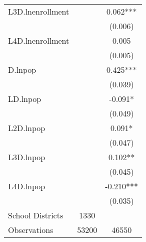 \begin{tabular}{lcc}
L3D.lnenrollment    &  & 0.062*** \\
                    &  & (0.006) \\
L4D.lnenrollment    &  & 0.005 \\
                    &  & (0.005) \\
D.lnpop             &  & 0.425*** \\
                    &  & (0.039) \\
LD.lnpop            &  & -0.091* \\
                    &  & (0.049) \\
L2D.lnpop           &  & 0.091* \\
                    &  & (0.047) \\
L3D.lnpop           &  & 0.102** \\
                    &  & (0.045) \\
L4D.lnpop           &  & -0.210*** \\
                    &  & (0.035) \\
\hline
School Districts    & 1330 & \\
Observations        & 53200 & 46550 \\
\hline
\end{tabular}

